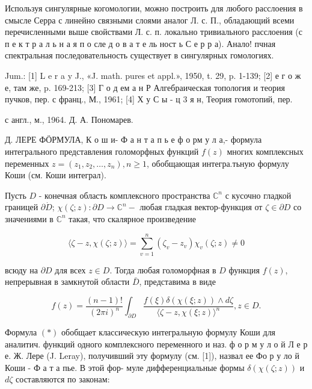 \documentclass[10pt]{article}
\begin{document}
Используя сингулярные когомологии, можно построить для любого расслоения в смысле Серра с линейно связными слоями аналог Л. с. П., обладающий всеми перечисленными выше свойствами Л. с. п. локально тривиального расслоения (с п е к т р а л ь н а я п о сле д о в а т е ль ност ь С е р р а). Анало! пчная спектральная последовательность существует в сингулярных гомологиях.



Jum.: [1] L e r a y J., «J. math. pures et appl.», 1950, t. 29, p. 1-139; [2] е г о ж е, там же, p. 169-213; [3] Г о д ем а н Р Алгебраическая топология и теория пучков, пер. с франц., М., 1961; [4] Х у С ы - ц 3 я н, Теория гомотопий, пер.

с англ., м., 1964. Д. А. Пономарев.

Д. ЛЕРЕ ФӦРМУЛА, К о ш и- Ф а н т а п ь е ф о рм у л а,- формула интегрального представления голоморфных функций $f(z)$ многих комплексных переменных $z=\left(z_{1}, z_{2}, \ldots, z_{n}\right), n \geqslant 1$, обобщающая интегра.тьную формулу Коши (см. Коши интеграл).



Пусть $D$ - конечная область комплексного пространства $\mathbb{C}^{n}$ с кусочно гладкой границей $\partial \dot{D}$; $\chi(\zeta ; z): \partial D \rightarrow \mathbb{C}^{n}-$ любая гладкая вектор-функция от $\zeta \in \partial D$ со значениями в $\mathbb{C}^{n}$ такая, что скалярное произведение



\[

\langle\zeta-z, \chi(\zeta ; z)\rangle=\sum_{v=1}^{n}\left(\zeta_{v}-z_{v}\right) \chi_{v}(\zeta ; z) \neq 0

\]



всюду на $\partial D$ для всех $z \in D$. Тогда любая голоморфная в $D$ функция $f(z)$, непрерывная в замкнутой области $\bar{D}$, представима в виде



\[

f(z)=\frac{(n-1) !}{(2 \pi i)^{n}} \int_{\partial D} \frac{f(\xi) \delta(\chi(\xi ; z)) \wedge d \zeta}{\langle\zeta-z, \chi(\xi ; z)\rangle^{n}}, z \in D .

\]



Формула $(*)$ обобщает классическую интегральную формулу Коши для аналитич. функций одного комплексного переменного и наз. ф о р м у л о й Л е р е. Ж. Лере (J. Leray), получивший эту формулу (см. [1]), назвал ее Фо р у ло й Коши - Ф а т а пье. В этой фор- муле дифференциальные формы $\delta(\chi(\zeta ; z))$ и $d \zeta$ составляются по законам:
\end{document}
